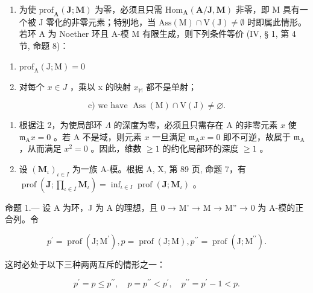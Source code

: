 \begin{enumerate}
\def\labelenumi{\arabic{enumi})}
\setcounter{enumi}{1}
\tightlist
\item
  为使 \(\mathrm{prof}_{\mathbf{A}}(\mathbf{J};\mathbf{M})\) 为零，必须且只需 \(\mathrm{Hom}_{\mathbf{A}}(\mathbf{A} / \mathbf{J},\mathbf{M})\) 非零，即 M 具有一个被 J 零化的非零元素；特别地，当 \(\mathrm{Ass(M)}\cap \mathrm{V(J)}\neq \emptyset\) 时即属此情形。若环 A 为 Noether 环且 A-模 M 有限生成，则下列条件等价 (IV, § 1, 第 4 节, 命题 8)：
\end{enumerate}

\begin{enumerate}
\def\labelenumi{\alph{enumi})}
\item
  \(\mathrm{prof}_{\mathrm{A}}(\mathrm{J};\mathrm{M}) = 0\)
\item
  对每个 \(x \in J\) ，乘以 x 的映射 \(x_{\mathbb{M}}\) 都不是单射；
\end{enumerate}

\[
\mathrm{c)} \text {   we have   } \operatorname{Ass} (\mathrm{M}) \cap \mathrm{V} (\mathrm{J}) \neq \varnothing .
\]

\begin{enumerate}
\def\labelenumi{\arabic{enumi})}
\setcounter{enumi}{2}
\item
  根据注 2，为使局部环 \(\Lambda\) 的深度为零，必须且只需存在 A 的非零元素 \(x\) 使 \(\mathfrak{m}_{\mathrm{A}}x = 0\) 。若 A 不是域，则元素 \(x\) 一旦满足 \(\mathfrak{m}_{\mathrm{A}}x = 0\) 即不可逆，故属于 \(\mathfrak{m}_{\mathrm{A}}\) ，从而满足 \(x^{2} = 0\) 。因此，维数 \(\geqslant 1\) 的约化局部环的深度 \(\geqslant 1\) 。
\item
  设 \((\mathbf{M}_{\iota})_{\iota \in I}\) 为一族 A-模。根据 A, X, 第 89 页, 命题 7，有 \(\operatorname{prof}(\mathbf{J};\prod_{\iota \in I}\mathbf{M}_{\iota}) = \inf_{\iota \in I}\operatorname{prof}(\mathbf{J};\mathbf{M}_{\iota})\) 。
\end{enumerate}

命题 1.--- 设 A 为环，J 为 A 的理想，且 0 → M' → M → M'' → 0 为 A-模的正合列。令

\[
p ^ {\prime} = \operatorname{prof} (\mathrm{J}; \mathrm{M} ^ {\prime}), p = \operatorname{prof} (\mathrm{J}; \mathrm{M}), p ^ {\prime \prime} = \operatorname{prof} (\mathrm{J}; \mathrm{M} ^ {\prime \prime}).
\]

这时必处于以下三种两两互斥的情形之一：

\[
p ^ {\prime} = p \leqslant p ^ {\prime \prime}, \quad p = p ^ {\prime \prime} <   p ^ {\prime}, \quad p ^ {\prime \prime} = p ^ {\prime} - 1 <   p.
\]

